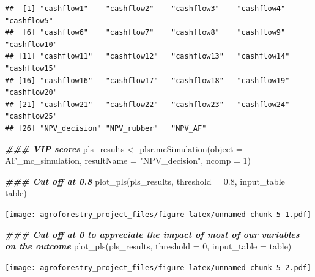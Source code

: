 \documentclass[
]{article}
\newenvironment{Shaded}{\begin{snugshade}}{\end{snugshade}}
\newcommand{\AttributeTok}[1]{\textcolor[rgb]{0.77,0.63,0.00}{#1}}
\newcommand{\DecValTok}[1]{\textcolor[rgb]{0.00,0.00,0.81}{#1}}
\newcommand{\DocumentationTok}[1]{\textcolor[rgb]{0.56,0.35,0.01}{\textbf{\textit{#1}}}}
\newcommand{\FloatTok}[1]{\textcolor[rgb]{0.00,0.00,0.81}{#1}}
\newcommand{\FunctionTok}[1]{\textcolor[rgb]{0.00,0.00,0.00}{#1}}
\newcommand{\NormalTok}[1]{#1}
\newcommand{\OtherTok}[1]{\textcolor[rgb]{0.56,0.35,0.01}{#1}}
\newcommand{\SpecialCharTok}[1]{\textcolor[rgb]{0.00,0.00,0.00}{#1}}
\newcommand{\StringTok}[1]{\textcolor[rgb]{0.31,0.60,0.02}{#1}}
\begin{document}
\begin{Shaded}
\end{Shaded}

\begin{verbatim}
##  [1] "cashflow1"    "cashflow2"    "cashflow3"    "cashflow4"    "cashflow5"   
##  [6] "cashflow6"    "cashflow7"    "cashflow8"    "cashflow9"    "cashflow10"  
## [11] "cashflow11"   "cashflow12"   "cashflow13"   "cashflow14"   "cashflow15"  
## [16] "cashflow16"   "cashflow17"   "cashflow18"   "cashflow19"   "cashflow20"  
## [21] "cashflow21"   "cashflow22"   "cashflow23"   "cashflow24"   "cashflow25"  
## [26] "NPV_decision" "NPV_rubber"   "NPV_AF"
\end{verbatim}

\begin{Shaded}
\begin{Highlighting}[]
\DocumentationTok{\#\#\# VIP scores}
\NormalTok{pls\_results }\OtherTok{\textless{}{-}} \FunctionTok{plsr.mcSimulation}\NormalTok{(}\AttributeTok{object =}\NormalTok{ AF\_mc\_simulation,}
                                 \AttributeTok{resultName =} \StringTok{"NPV\_decision"}\NormalTok{,}
                                 \AttributeTok{ncomp =} \DecValTok{1}\NormalTok{)}

\DocumentationTok{\#\#\# Cut off at 0.8}
\FunctionTok{plot\_pls}\NormalTok{(pls\_results, }\AttributeTok{threshold =} \FloatTok{0.8}\NormalTok{, }\AttributeTok{input\_table =}\NormalTok{ table)}
\end{Highlighting}
\end{Shaded}

\texttt{[image: agroforestry\_project\_files/figure-latex/unnamed-chunk-5-1.pdf]}

\begin{Shaded}
\begin{Highlighting}[]
\DocumentationTok{\#\#\# Cut off at 0 to appreciate the impact of most of our variables on the outcome}
\FunctionTok{plot\_pls}\NormalTok{(pls\_results, }\AttributeTok{threshold =} \DecValTok{0}\NormalTok{, }\AttributeTok{input\_table =}\NormalTok{ table)}
\end{Highlighting}
\end{Shaded}

\texttt{[image: agroforestry\_project\_files/figure-latex/unnamed-chunk-5-2.pdf]}
\end{document}
